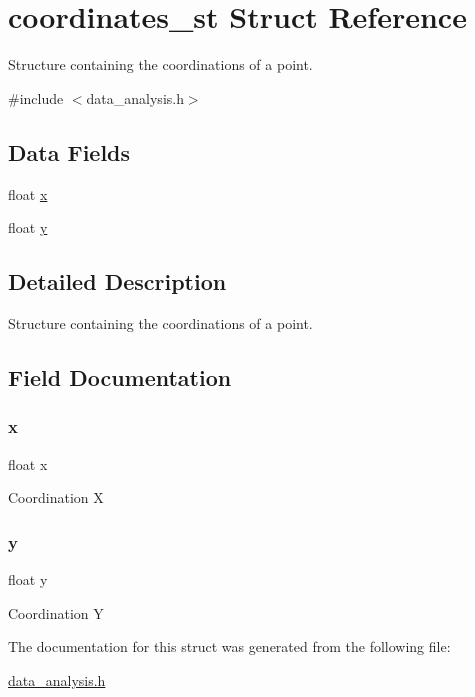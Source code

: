 \hypertarget{structcoordinates__st}{}\section{coordinates\+\_\+st Struct Reference}
\label{structcoordinates__st}


Structure containing the coordinations of a point.  




{\ttfamily \#include $<$data\+\_\+analysis.\+h$>$}

\subsection*{Data Fields}
\begin{DoxyCompactItemize}
\item 
float \mbox{\hyperlink{structcoordinates__st_ad0da36b2558901e21e7a30f6c227a45e}{x}}
\item 
float \mbox{\hyperlink{structcoordinates__st_aa4f0d3eebc3c443f9be81bf48561a217}{y}}
\end{DoxyCompactItemize}


\subsection{Detailed Description}
Structure containing the coordinations of a point. 

\subsection{Field Documentation}
\mbox{\label{structcoordinates__st_ad0da36b2558901e21e7a30f6c227a45e}} 
\subsubsection{\texorpdfstring{x}{x}}
{\footnotesize\ttfamily float x}

Coordination X \mbox{\label{structcoordinates__st_aa4f0d3eebc3c443f9be81bf48561a217}} 
\subsubsection{\texorpdfstring{y}{y}}
{\footnotesize\ttfamily float y}

Coordination Y 

The documentation for this struct was generated from the following file\+:\begin{DoxyCompactItemize}
\item 
\mbox{\hyperlink{data__analysis_8h}{data\+\_\+analysis.\+h}}\end{DoxyCompactItemize}
